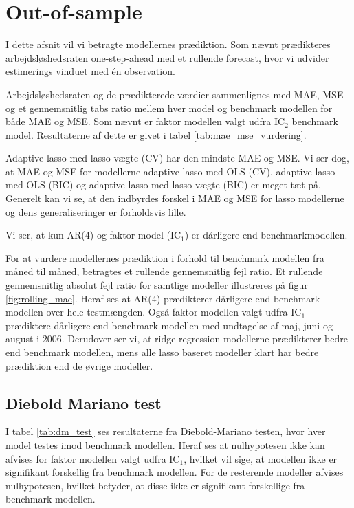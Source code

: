 \chapter{Out-of-sample} \label{ch:out-of-sample}
I dette afsnit vil vi betragte modellernes prædiktion.
Som nævnt prædikteres arbejdsløshedsraten one-step-ahead med et rullende forecast, hvor vi udvider estimerings vinduet med én observation. 

Arbejdsløshedsraten og de prædikterede værdier sammenlignes med MAE, MSE og et gennemsnitlig tabs ratio mellem hver model og benchmark modellen for både MAE og MSE.
Som nævnt er faktor modellen valgt udfra IC\(_2\) benchmark model.
Resultaterne af dette er givet i tabel \ref{tab:mae_mse_vurdering}.


Adaptive lasso med lasso vægte (CV) har den mindste MAE og MSE. 
Vi ser dog, at MAE og MSE for modellerne adaptive lasso med OLS (CV), adaptive lasso med OLS (BIC) og adaptive lasso med lasso vægte (BIC) er meget tæt på. 
Generelt kan vi se, at den indbyrdes forskel i MAE og MSE for lasso modellerne og dens generaliseringer er forholdsvis lille.
 
Vi ser, at kun AR(4) og faktor model (IC$_1$) er dårligere end benchmarkmodellen. 

For at vurdere modellernes prædiktion i forhold til benchmark modellen fra måned til måned, betragtes et rullende gennemsnitlig fejl ratio.
Et rullende gennemsnitlig absolut fejl ratio for samtlige modeller illustreres på figur \ref{fig:rolling_mae}.
Heraf ses at AR(4) prædikterer dårligere end benchmark modellen over hele testmængden.
Også faktor modellen valgt udfra IC$_1$ prædiktere dårligere end benchmark modellen med undtagelse af maj, juni og august i 2006.
Derudover ser vi, at ridge regression modellerne prædikterer bedre end benchmark modellen, mens alle lasso baseret modeller klart har bedre prædiktion end de øvrige modeller.
%
%

%
%

\section{Diebold Mariano test}
I tabel \ref{tab:dm_test} ses resultaterne fra Diebold-Mariano testen, hvor hver model testes imod benchmark modellen.
Heraf ses at nulhypotesen ikke kan afvises for faktor modellen valgt udfra IC\(_1\), hvilket vil sige, at modellen ikke er signifikant forskellig fra benchmark modellen.
For de resterende modeller afvises nulhypotesen, hvilket betyder, at disse ikke er signifikant forskellige fra benchmark modellen.
%

%
\newpage
